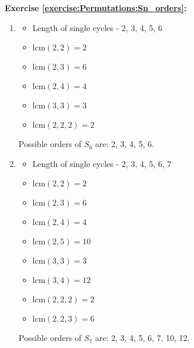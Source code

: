 \noindent\textbf{Exercise \ref{exercise:Permutations:Sn_orders}:} %
\begin{enumerate}[{a.}]
\item
	\begin{multicols}{2}
	\begin{itemize}
	\item
	Length of single cycles - 2, 3, 4, 5, 6
	
	\item
	$\mbox{lcm}(2, 2) = 2$
	
	\item
	$\mbox{lcm}(2, 3) = 6$
	
	\item
	$\mbox{lcm}(2, 4) = 4$
	
	\item
	$\mbox{lcm}(3, 3) = 3$
	
	\item
	$\mbox{lcm}(2, 2, 2) = 2$
	\end{itemize}
	\end{multicols}
Possible orders of $S_6$ are: 2, 3, 4, 5, 6.
	
\item
	\begin{multicols}{2}
	\begin{itemize}
	\item
	Length of single cycles - 2, 3, 4, 5, 6, 7
	
	\item
	$\mbox{lcm}(2, 2) = 2$
	
	\item
	$\mbox{lcm}(2, 3) = 6$
	
	\item
	$\mbox{lcm}(2, 4) = 4$
	
	\item
	$\mbox{lcm}(2, 5) = 10$
	
	\item
	$\mbox{lcm}(3, 3) = 3$
	
	\item
	$\mbox{lcm}(3, 4) = 12$
	
	\item
	$\mbox{lcm}(2, 2, 2) = 2$
	
	\item
	$\mbox{lcm}(2, 2, 3) = 6$
	\end{itemize}
	\end{multicols}
Possible orders of $S_7$ are: 2, 3, 4, 5, 6, 7, 10, 12.


\end{enumerate}
